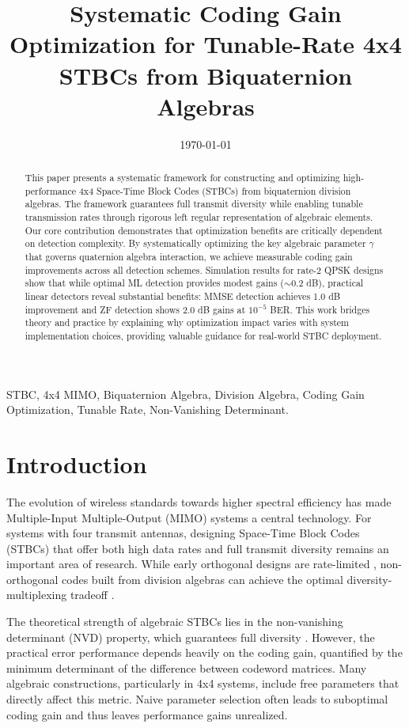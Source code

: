 \documentclass[twocolumn,conference]{IEEEtran}
\title{Systematic Coding Gain Optimization for Tunable-Rate 4x4 STBCs from Biquaternion Algebras}
\author{
    \IEEEauthorblockN{Ilias Chrysovergis}
}
\date{\today}
\begin{document}
\maketitle

\begin{abstract}
This paper presents a systematic framework for constructing and optimizing  high-performance 4x4 Space-Time Block Codes (STBCs) from biquaternion
division algebras. 
The framework guarantees full transmit diversity while enabling tunable
transmission rates through rigorous left regular representation of algebraic elements. 
Our core contribution demonstrates that optimization benefits are critically dependent on detection complexity. 
By systematically optimizing the key algebraic parameter $\gamma$ that governs quaternion algebra interaction, we achieve measurable coding gain improvements across all detection schemes. 
Simulation results for rate-2 QPSK designs show that while optimal ML detection provides modest gains ($\sim$0.2 dB), practical linear detectors reveal substantial benefits: 
MMSE detection achieves 1.0 dB improvement and ZF detection shows 2.0 dB gains at $10^{-5}$ BER. 
This work bridges theory and practice by explaining why optimization impact varies with system implementation choices, providing valuable guidance for real-world STBC deployment.
\end{abstract}

\begin{IEEEkeywords}
STBC, 4x4 MIMO, Biquaternion Algebra, Division Algebra, Coding Gain Optimization, Tunable Rate, Non-Vanishing Determinant.
\end{IEEEkeywords}

\section{Introduction}
The evolution of wireless standards towards higher spectral efficiency has made Multiple-Input Multiple-Output (MIMO) systems a central technology. 
For systems with four transmit antennas, designing Space-Time Block Codes (STBCs) that offer both high data rates and full transmit diversity remains an important area of research. 
While early orthogonal designs are rate-limited \cite{1}, non-orthogonal codes built from division algebras can achieve the optimal diversity-multiplexing tradeoff \cite{2,3}.

The theoretical strength of algebraic STBCs lies in the non-vanishing determinant (NVD) property, which guarantees full diversity \cite{4}. However, the practical error performance depends heavily on the coding gain, quantified by the minimum determinant of the difference between codeword matrices. 
Many algebraic constructions, particularly in 4x4 systems, include free parameters that directly affect this metric. 
Naive parameter selection often leads to suboptimal coding gain and thus leaves performance gains unrealized.
\end{document}
